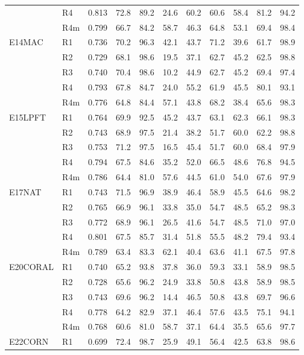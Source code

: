 \begin{table}[h]
\begin{tabular}{@{}llrrrrrrrrr@{}}
 & R4 & 0.813 & 72.8 & 89.2 & 24.6 & 60.2 & 60.6 & 58.4 & 81.2 & 94.2 \\
 & R4m & 0.799 & 66.7 & 84.2 & 58.7 & 46.3 & 64.8 & 53.1 & 69.4 & 98.4 \\
\addlinespace
E14MAC & R1 & 0.736 & 70.2 & 96.3 & 42.1 & 43.7 & 71.2 & 39.6 & 61.7 & 98.9 \\
 & R2 & 0.729 & 68.1 & 98.6 & 19.5 & 37.1 & 62.7 & 45.2 & 62.5 & 98.8 \\
 & R3 & 0.740 & 70.4 & 98.6 & 10.2 & 44.9 & 62.7 & 45.2 & 69.4 & 97.4 \\
 & R4 & 0.793 & 67.8 & 84.7 & 24.0 & 55.2 & 61.9 & 45.5 & 80.1 & 93.1 \\
 & R4m & 0.776 & 64.8 & 84.4 & 57.1 & 43.8 & 68.2 & 38.4 & 65.6 & 98.3 \\
\addlinespace
E15LPFT & R1 & 0.764 & 69.9 & 92.5 & 45.2 & 43.7 & 63.1 & 62.3 & 66.1 & 98.3 \\
 & R2 & 0.743 & 68.9 & 97.5 & 21.4 & 38.2 & 51.7 & 60.0 & 62.2 & 98.8 \\
 & R3 & 0.753 & 71.2 & 97.5 & 16.5 & 45.4 & 51.7 & 60.0 & 68.4 & 97.9 \\
 & R4 & 0.794 & 67.5 & 84.6 & 35.2 & 52.0 & 66.5 & 48.6 & 76.8 & 94.5 \\
 & R4m & 0.786 & 64.4 & 81.0 & 57.6 & 44.5 & 61.0 & 54.0 & 67.6 & 97.9 \\
\addlinespace
E17NAT & R1 & 0.743 & 71.5 & 96.9 & 38.9 & 46.4 & 58.9 & 45.5 & 64.6 & 98.2 \\
 & R2 & 0.765 & 66.9 & 96.1 & 33.8 & 35.0 & 54.7 & 48.5 & 65.2 & 98.3 \\
 & R3 & 0.772 & 68.9 & 96.1 & 26.5 & 41.6 & 54.7 & 48.5 & 71.0 & 97.0 \\
 & R4 & 0.801 & 67.5 & 85.7 & 31.4 & 51.8 & 55.5 & 48.2 & 79.4 & 93.4 \\
 & R4m & 0.789 & 63.4 & 83.3 & 62.1 & 40.4 & 63.6 & 41.1 & 67.5 & 97.8 \\
\addlinespace
E20CORAL & R1 & 0.740 & 65.2 & 93.8 & 37.8 & 36.0 & 59.3 & 33.1 & 58.9 & 98.5 \\
 & R2 & 0.728 & 65.6 & 96.2 & 24.9 & 33.8 & 50.8 & 43.8 & 58.9 & 98.5 \\
 & R3 & 0.743 & 69.6 & 96.2 & 14.4 & 46.5 & 50.8 & 43.8 & 69.7 & 96.6 \\
 & R4 & 0.778 & 64.2 & 82.9 & 37.1 & 46.4 & 57.6 & 43.5 & 75.1 & 94.1 \\
 & R4m & 0.768 & 60.6 & 81.0 & 58.7 & 37.1 & 64.4 & 35.5 & 65.6 & 97.7 \\
\addlinespace
E22CORN & R1 & 0.699 & 72.4 & 98.7 & 25.9 & 49.1 & 56.4 & 42.5 & 63.8 & 98.6 \\

\end{tabular}
\end{table}
